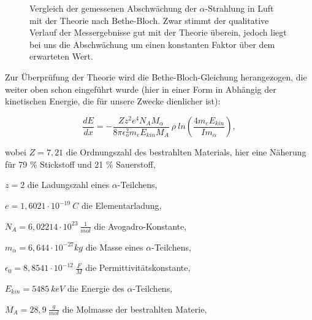 \documentclass[bigchapter,colorback,accentcolor=tud4b,linedtoc,11pt]{tudreport}
\begin{document}
\begin{figure}[H]
    \caption{Vergleich der gemessenen Abschwächung der $\alpha$-Strahlung in
      Luft mit der Theorie nach Bethe-Bloch. Zwar stimmt der qualitative Verlauf
    der Messergebnisse gut mit der Theorie überein, jedoch liegt bei uns die
    Abschwächung um einen konstanten Faktor über dem erwarteten Wert.}
\end{figure}

Zur Überprüfung der Theorie wird die Bethe-Bloch-Gleichung herangezogen, die weiter oben schon eingeführt wurde (hier in einer Form in Abhängig der kinetischen Energie, die für unsere Zwecke dienlicher ist): 

$$\frac{dE}{dx} = - \frac{Z z^2 e^4 N_A M_{\alpha}}{8 \pi \epsilon_o^2 m_e E_{kin} M_A}~\rho ~ ln \left( \frac{4 m_e E_{kin}}{I m_{\alpha}} \right),$$

wobei
$Z = 7,21$ die Ordnungszahl des bestrahlten Materials, hier eine Näherung für 79 \% Stickstoff und 21 \% Sauerstoff,

$z = 2$ die Ladungszahl eines $\alpha$-Teilchens,

$e = 1,6021 \cdot 10^{-19}~C$ die Elementarladung,

$N_A = 6,02214 \cdot 10^{23}~ \frac{1}{mol}$ die Avogadro-Konstante, 

$m_{\alpha} = 6,644 \cdot 10^{-27} kg$ die Masse eines $\alpha$-Teilchens,

$\epsilon_0 = 8,8541 \cdot 10^{-12}~ \frac{F}{M}$ die Permittivitätskonstante,

$E_{kin} = 5485~keV$ die Energie des $\alpha$-Teilchens,

$M_A = 28,9~ \frac{g}{mol}$ die Molmasse der bestrahlten Materie, 
\end{document}
